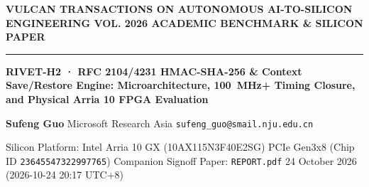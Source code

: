 \documentclass[11pt,a4paper]{article}
\begin{document}
{\scriptsize\sffamily\textcolor{vulcan}{\textbf{VULCAN TRANSACTIONS ON AUTONOMOUS AI-TO-SILICON ENGINEERING \hfill VOL. 2026 \textperiodcentered{} ACADEMIC BENCHMARK \& SILICON PAPER}}\par}

\vspace{1pt}\textcolor{vulcan}{\rule{\textwidth}{1.2pt}}\vspace{3pt}

\begin{center}

{\sffamily\LARGE\bfseries RIVET-H2 · RFC 2104/\allowbreak{}4231 HMAC-SHA-256 \& Context Save/\allowbreak{}Restore Engine: Microarchitecture, 100~MHz+ Timing Closure, and Physical Arria 10 FPGA Evaluation\par}\vspace{3pt}

{\small\sffamily\textbf{Sufeng Guo} \textperiodcentered{} Microsoft Research Asia \textperiodcentered{} \texttt{sufeng\_guo@smail.nju.edu.cn}\par}\vspace{1pt}

{\scriptsize\sffamily\textcolor{black!75}{Silicon Platform: Intel Arria 10 GX (\allowbreak{}10AX115N3F40E2SG)\allowbreak{} PCIe Gen3x8 (Chip ID \texttt{23645547322997765}) \textperiodcentered{} Companion Signoff Paper: \texttt{REPORT.pdf} \textperiodcentered{} 24 October 2026 (\allowbreak{}2026-10-24 20:17 UTC+\allowbreak{}8)\allowbreak{}}\par}

\end{center}\vspace{2pt}
\end{document}
